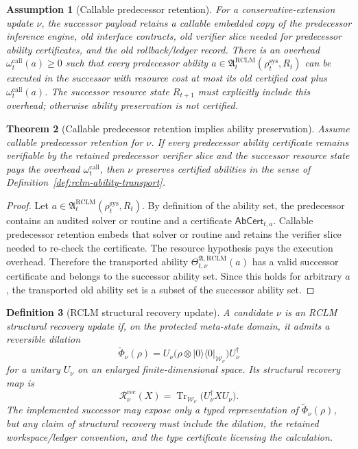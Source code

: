 \documentclass[11pt,a4paper]{article}
\newtheorem{theorem}{Theorem}[section]
\newtheorem{definition}[theorem]{Definition}
\newtheorem{assumption}[theorem]{Assumption}
\newcommand{\Tr}{\operatorname{Tr}}
\newcommand{\RCLM}{\mathrm{RCLM}}
\newcommand{\sys}{\mathrm{sys}}
\newcommand{\rec}{\mathrm{rec}}
\newcommand{\call}{\mathrm{call}}
\begin{document}
\begin{assumption}[Callable predecessor retention]
\label{ass:rclm-callable-predecessor-retention}
For a conservative-extension update \(\nu\), the successor payload retains a callable embedded copy of the predecessor inference engine, old interface contracts, old verifier slice needed for predecessor ability certificates, and the old rollback/ledger record.  There is an overhead \(\omega_{t}^{\call}(a)\ge0\) such that every predecessor ability \(a\in\mathfrak A_t^{\RCLM}(\rho_t^{\sys},R_t)\) can be executed in the successor with resource cost at most its old certified cost plus \(\omega_t^{\call}(a)\).  The successor resource state \(R_{t+1}\) must explicitly include this overhead; otherwise ability preservation is not certified.
\end{assumption}

\begin{theorem}[Callable predecessor retention implies ability preservation]
\label{thm:rclm-callable-retention-ability-preservation}
Assume callable predecessor retention for \(\nu\).  If every predecessor ability certificate remains verifiable by the retained predecessor verifier slice and the successor resource state pays the overhead \(\omega_t^{\call}\), then \(\nu\) preserves certified abilities in the sense of Definition~\ref{def:rclm-ability-transport}.
\end{theorem}

\begin{proof}
Let \(a\in\mathfrak A_t^{\RCLM}(\rho_t^{\sys},R_t)\).  By definition of the ability set, the predecessor contains an audited solver or routine and a certificate \(\mathsf{AbCert}_{t,a}\).  Callable predecessor retention embeds that solver or routine and retains the verifier slice needed to re-check the certificate.  The resource hypothesis pays the execution overhead.  Therefore the transported ability \(\Theta_{t,\nu}^{\mathfrak A,\RCLM}(a)\) has a valid successor certificate and belongs to the successor ability set.  Since this holds for arbitrary \(a\), the transported old ability set is a subset of the successor ability set.
\end{proof}

\begin{definition}[RCLM structural recovery update]
\label{def:rclm-structural-recovery-update}
A candidate \(\nu\) is an RCLM structural recovery update if, on the protected meta-state domain, it admits a reversible dilation
\[
\widetilde\Phi_\nu(\rho)
=
U_\nu\bigl(\rho\otimes |0\rangle\langle0|_{\mathcal W_\nu}\bigr)U_\nu^\dagger
\]
for a unitary \(U_\nu\) on an enlarged finite-dimensional space.  Its structural recovery map is
\[
\mathcal R^{\rec}_{\nu}(X)=
\Tr_{\mathcal W_\nu}\!\bigl(U_\nu^\dagger X U_\nu\bigr).
\]
The implemented successor may expose only a typed representation of \(\widetilde\Phi_\nu(\rho)\), but any claim of structural recovery must include the dilation, the retained workspace/ledger convention, and the type certificate licensing the calculation.
\end{definition}
\end{document}
